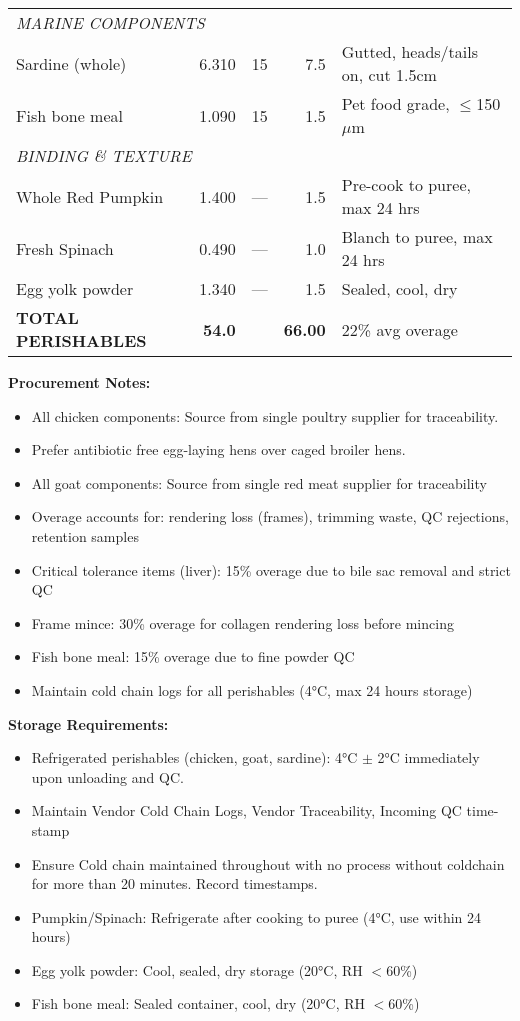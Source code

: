 \begin{table}[h]
\begin{tabular}{@{}lrrrp{5cm}@{}}
\midrule
\multicolumn{5}{l}{\textit{MARINE COMPONENTS}} \\
Sardine (whole) & 6.310 & 15 & 7.5 & Gutted, heads/tails on, cut 1.5cm \\
Fish bone meal & 1.090 & 15 & 1.5 & Pet food grade, $\le$150 $\mu$m \\
\midrule
\multicolumn{5}{l}{\textit{BINDING \& TEXTURE}} \\
Whole Red Pumpkin & 1.400 & --- & 1.5 & Pre-cook to puree, max 24 hrs \\
Fresh Spinach & 0.490 & --- & 1.0 & Blanch to puree, max 24 hrs\\
Egg yolk powder & 1.340 & --- & 1.5 & Sealed, cool, dry \\
\midrule
\textbf{TOTAL PERISHABLES} & \textbf{54.0} & & \textbf{66.00} & 22\% avg overage \\
\bottomrule
\end{tabular}
\end{table}

\vspace{1em}

\textbf{Procurement Notes:}
\begin{itemize}
\item All chicken components: Source from single poultry supplier for traceability. 
\item Prefer antibiotic free egg-laying hens over caged broiler hens. 
\item All goat components: Source from single red meat supplier for traceability
\item Overage accounts for: rendering loss (frames), trimming waste, QC rejections, retention samples
\item Critical tolerance items (liver): 15\% overage due to bile sac removal and strict QC
\item Frame mince: 30\% overage for collagen rendering loss before mincing
\item Fish bone meal: 15\% overage due to fine powder QC
\item Maintain cold chain logs for all perishables (4°C, max 24 hours storage)
\end{itemize}

\textbf{Storage Requirements:}
\begin{itemize}
\item Refrigerated perishables (chicken, goat, sardine): 4°C $\pm$ 2°C immediately upon unloading and QC. 
\item Maintain Vendor Cold Chain Logs, Vendor Traceability, Incoming QC time-stamp
\item Ensure Cold chain maintained throughout with no process without coldchain for more than 20 minutes. Record timestamps. 
\item Pumpkin/Spinach: Refrigerate after cooking to puree (4°C, use within 24 hours)
\item Egg yolk powder: Cool, sealed, dry storage (20°C, RH $<$60\%)
\item Fish bone meal: Sealed container, cool, dry (20°C, RH $<$60\%)
\end{itemize}

